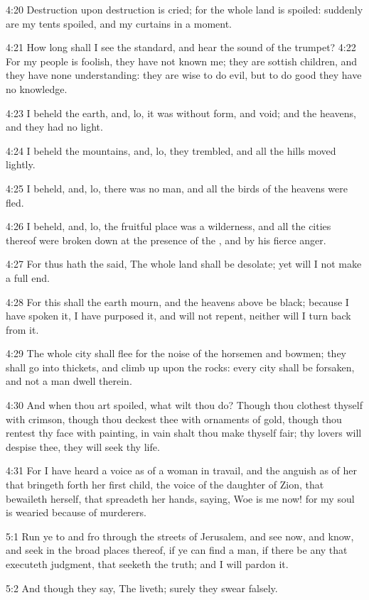 4:20 Destruction upon destruction is cried; for the whole land is
spoiled: suddenly are my tents spoiled, and my curtains in a moment.

4:21 How long shall I see the standard, and hear the sound of the
trumpet?  4:22 For my people is foolish, they have not known me; they
are sottish children, and they have none understanding: they are wise
to do evil, but to do good they have no knowledge.

4:23 I beheld the earth, and, lo, it was without form, and void; and
the heavens, and they had no light.

4:24 I beheld the mountains, and, lo, they trembled, and all the hills
moved lightly.

4:25 I beheld, and, lo, there was no man, and all the birds of the
heavens were fled.

4:26 I beheld, and, lo, the fruitful place was a wilderness, and all
the cities thereof were broken down at the presence of the \LORD, and
by his fierce anger.

4:27 For thus hath the \LORD said, The whole land shall be desolate;
yet will I not make a full end.

4:28 For this shall the earth mourn, and the heavens above be black;
because I have spoken it, I have purposed it, and will not repent,
neither will I turn back from it.

4:29 The whole city shall flee for the noise of the horsemen and
bowmen; they shall go into thickets, and climb up upon the rocks:
every city shall be forsaken, and not a man dwell therein.

4:30 And when thou art spoiled, what wilt thou do? Though thou
clothest thyself with crimson, though thou deckest thee with ornaments
of gold, though thou rentest thy face with painting, in vain shalt
thou make thyself fair; thy lovers will despise thee, they will seek
thy life.

4:31 For I have heard a voice as of a woman in travail, and the
anguish as of her that bringeth forth her first child, the voice of
the daughter of Zion, that bewaileth herself, that spreadeth her
hands, saying, Woe is me now! for my soul is wearied because of
murderers.

5:1 Run ye to and fro through the streets of Jerusalem, and see now,
and know, and seek in the broad places thereof, if ye can find a man,
if there be any that executeth judgment, that seeketh the truth; and I
will pardon it.

5:2 And though they say, The \LORD liveth; surely they swear falsely.

